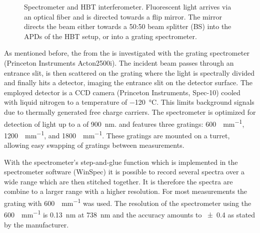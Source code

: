 		\begin{figure}[!htb]
			\centering
			\caption[Spectrometer and HBT setup]{Spectrometer and HBT interferometer. Fluorescent light arrives via an optical fiber and is directed towards a flip mirror. The mirror directs the beam either towards a 50:50 beam splitter (BS) into the APDs of the HBT setup, or into a grating spectrometer.}
			\label{fig::hbt_spectrometer}
		\end{figure}

		As mentioned before, the \fl from the \sivs is investigated with the grating spectrometer (Princeton Instruments Acton2500i).
		The incident beam passes through an entrance slit, is then scattered on the grating where the light is spectrally divided and finally hits a detector, imaging the entrance slit on the detector surface.
		The employed detector is a CCD camera (Princeton Instruments, Spec-10) cooled with liquid nitrogen to a temperature of \SI{-120}{\celsius}. This limits background signals due to thermally generated free charge carriers.
		The spectrometer is optimized for detection of light up to a \wl of \SI{900}{nm}.
		and features three gratings: \SI[per-mode=symbol]{600}{\lines\per\mm}, \SI[per-mode=symbol]{1200}{\lines\per\mm}, and \SI[per-mode=symbol]{1800}{\lines\per\mm}.
		These gratings are mounted on a turret, allowing easy swapping of gratings between measurements.

		With the spectrometer's step-and-glue function which is implemented in the spectrometer software (WinSpec) it is possible to record several spectra over a wide \wl range which are then stitched together.
		It is therefore the spectra are combine to a larger \wl range with a higher resolution.
		For most measurements the grating with \SI[per-mode=symbol]{600}{\lines\per\mm} was used.
		The resolution of the spectrometer using the \SI{600}{\lines\per\mm} is \SI{0.13}{nm} at \SI{738}{nm} and the accuracy amounts to \num{\pm0.4} as stated by the manufacturer.


